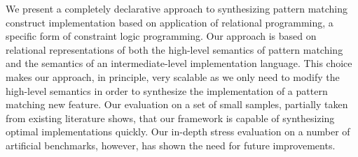 We present a completely declarative approach to synthesizing pattern matching construct implementation based on
application of relational programming, a specific form of constraint logic programming. Our approach is based on
relational representations of both the high-level semantics of pattern matching and the semantics of
an intermediate-level implementation language. This choice makes our approach, in principle, very scalable as we only
need to modify the high-level semantics in order to synthesize the implementation of a pattern matching new feature.
Our evaluation on a set of small samples, partially taken from existing literature shows, that our framework is capable
of synthesizing optimal implementations quickly. Our in-depth stress evaluation on a number of artificial benchmarks,
however, has shown the need for future improvements.

